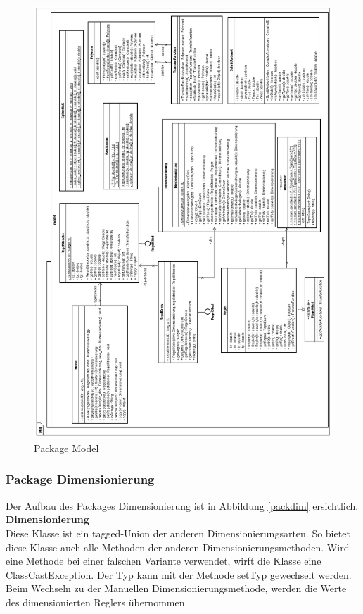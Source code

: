 \begin{figure}[p]
\centering
\includegraphics[width=1\textwidth]{packmodel.png}
\caption{Package Model}
\label{packmodel}
\end{figure}

\newpage
\subsubsection{Package Dimensionierung}
Der Aufbau des Packages Dimensionierung ist in Abbildung \ref{packdim} ersichtlich.\\

\textbf{Dimensionierung}\\
Diese Klasse ist ein tagged-Union der anderen Dimensionierungsarten. So bietet diese Klasse auch alle Methoden der anderen Dimensionierungsmethoden. Wird eine Methode bei einer falschen Variante verwendet, wirft die Klasse eine ClassCastException. Der Typ kann mit der Methode setTyp gewechselt werden. Beim Wechseln zu der Manuellen Dimensionierungsmethode, werden die Werte des dimensionierten Reglers übernommen.\\

